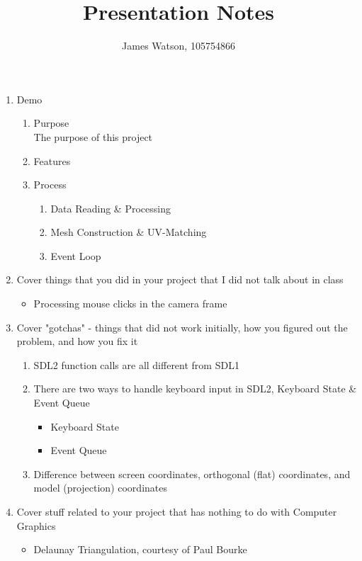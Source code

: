 \documentclass{hw_grad}
\title{Presentation Notes}
\institute{University of Colorado Boulder}
\author{James Watson, 105754866}
\begin{document}
	\maketitle
	
	\begin{enumerate}
		\item Demo
		\begin{enumerate}
			\item Purpose\\
			The purpose of this project
			\item Features
			\item Process
			\begin{enumerate}
				\item Data Reading \& Processing
				\item Mesh Construction \& UV-Matching
				\item Event Loop
			\end{enumerate}
		\end{enumerate}
		\item Cover things that you did in your project that I did not talk about in class
		\begin{itemize}
			\item Processing mouse clicks in the camera frame
		\end{itemize}
		\item Cover "gotchas" - things that did not work initially, how you figured out the problem, and how you fix it
		\begin{enumerate}
			\item SDL2 function calls are all different from SDL1
			\item There are two ways to handle keyboard input in SDL2, Keyboard State \& Event Queue
			\begin{itemize}
				\item Keyboard State
				\item Event Queue
			\end{itemize}
			\item Difference between screen coordinates, orthogonal (flat) coordinates, and model (projection) coordinates
		\end{enumerate}
		\item Cover stuff related to your project that has nothing to do with Computer Graphics
		\begin{itemize}
			\item Delaunay Triangulation, courtesy of Paul Bourke
			\begin{itemize}

\end{itemize}
\end{itemize}
\end{enumerate}
\end{document}
